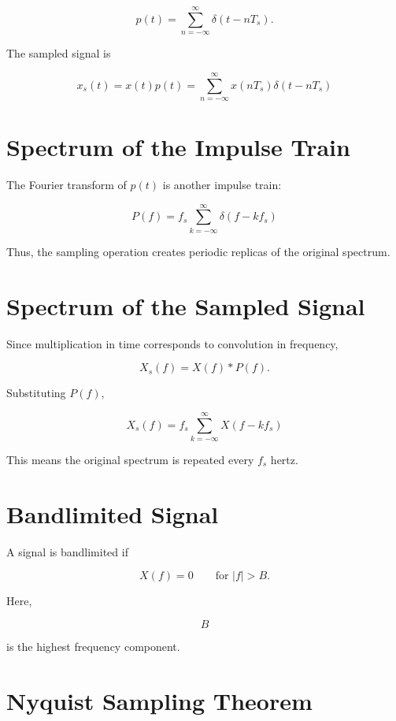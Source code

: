 \[
p(t)=
\sum_{n=-\infty}^{\infty}\delta(t-nT_s).
\]

The sampled signal is

\[
\boxed{
x_s(t)=x(t)p(t)
=
\sum_{n=-\infty}^{\infty}
x(nT_s)\delta(t-nT_s)
}
\]


\section{Spectrum of the Impulse Train}

The Fourier transform of \(p(t)\) is another impulse train:

\[
\boxed{
P(f)=
f_s
\sum_{k=-\infty}^{\infty}
\delta(f-kf_s)
}
\]

Thus, the sampling operation creates periodic replicas of the original spectrum.


\section{Spectrum of the Sampled Signal}

Since multiplication in time corresponds to convolution in frequency,

\[
X_s(f)=X(f)*P(f).
\]

Substituting \(P(f)\),

\[
\boxed{
X_s(f)=
f_s
\sum_{k=-\infty}^{\infty}
X(f-kf_s)
}
\]

This means the original spectrum is repeated every \(f_s\) hertz.


\section{Bandlimited Signal}

A signal is bandlimited if

\[
X(f)=0
\qquad \text{for } |f|>B.
\]

Here,

\[
B
\]

is the highest frequency component.


\section{Nyquist Sampling Theorem}

